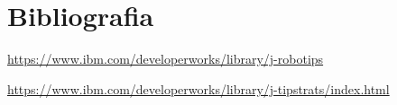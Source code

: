 \chapter{Bibliografia}

\url{https://www.ibm.com/developerworks/library/j-robotips}


\url{https://www.ibm.com/developerworks/library/j-tipstrats/index.html}